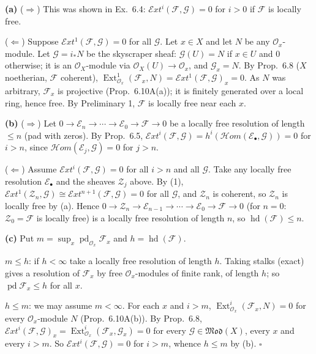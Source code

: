 \documentclass[11pt]{article}
\begin{document}
\textbf{(a)} ($\Rightarrow$) This was shown in Ex.~6.4: $\mathcal{E}xt^i(\mathcal F,\mathcal G)=0$ for $i>0$ if $\mathcal F$ is locally free.

($\Leftarrow$) Suppose $\mathcal{E}xt^1(\mathcal F,\mathcal G)=0$ for all $\mathcal G$. Let $x\in X$ and let $N$ be any $\mathcal O_x$-module. Let $\mathcal G=i_*N$ be the skyscraper sheaf: $\mathcal G(U)=N$ if $x\in U$ and $0$ otherwise; it is an $\mathcal O_X$-module via $\mathcal O_X(U)\to\mathcal O_x$, and $\mathcal G_x=N$. By Prop.~6.8 ($X$ noetherian, $\mathcal F$ coherent), $\operatorname{Ext}^1_{\mathcal O_x}(\mathcal F_x,N)=\mathcal{E}xt^1(\mathcal F,\mathcal G)_x=0$. As $N$ was arbitrary, $\mathcal F_x$ is projective (Prop.~6.10A(a)); it is finitely generated over a local ring, hence free. By Preliminary 1, $\mathcal F$ is locally free near each $x$.

\textbf{(b)} ($\Rightarrow$) Let $0\to\mathcal E_n\to\cdots\to\mathcal E_0\to\mathcal F\to0$ be a locally free resolution of length $\le n$ (pad with zeros). By Prop.~6.5, $\mathcal{E}xt^i(\mathcal F,\mathcal G)=h^i(\mathcal{H}om(\mathcal E_\bullet,\mathcal G))=0$ for $i>n$, since $\mathcal{H}om(\mathcal E_j,\mathcal G)=0$ for $j>n$.

($\Leftarrow$) Assume $\mathcal{E}xt^i(\mathcal F,\mathcal G)=0$ for all $i>n$ and all $\mathcal G$. Take any locally free resolution $\mathcal E_\bullet$ and the sheaves $\mathcal Z_j$ above. By (1), $\mathcal{E}xt^1(\mathcal Z_n,\mathcal G)\cong\mathcal{E}xt^{n+1}(\mathcal F,\mathcal G)=0$ for all $\mathcal G$, and $\mathcal Z_n$ is coherent, so $\mathcal Z_n$ is locally free by (a). Hence $0\to\mathcal Z_n\to\mathcal E_{n-1}\to\cdots\to\mathcal E_0\to\mathcal F\to0$ (for $n=0$: $\mathcal Z_0=\mathcal F$ is locally free) is a locally free resolution of length $n$, so $\operatorname{hd}(\mathcal F)\le n$.

\textbf{(c)} Put $m=\sup_x\operatorname{pd}_{\mathcal O_x}\mathcal F_x$ and $h=\operatorname{hd}(\mathcal F)$.

$m\le h$: if $h<\infty$ take a locally free resolution of length $h$. Taking stalks (exact) gives a resolution of $\mathcal F_x$ by free $\mathcal O_x$-modules of finite rank, of length $h$; so $\operatorname{pd}\mathcal F_x\le h$ for all $x$.

$h\le m$: we may assume $m<\infty$. For each $x$ and $i>m$, $\operatorname{Ext}^i_{\mathcal O_x}(\mathcal F_x,N)=0$ for every $\mathcal O_x$-module $N$ (Prop.~6.10A(b)). By Prop.~6.8, $\mathcal{E}xt^i(\mathcal F,\mathcal G)_x=\operatorname{Ext}^i_{\mathcal O_x}(\mathcal F_x,\mathcal G_x)=0$ for every $\mathcal G\in\mathfrak{Mod}(X)$, every $x$ and every $i>m$. So $\mathcal{E}xt^i(\mathcal F,\mathcal G)=0$ for $i>m$, whence $h\le m$ by (b). \hfill$\square$
\end{document}
